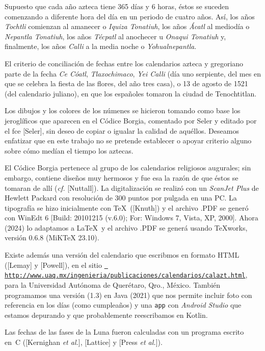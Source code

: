 Supuesto que cada a\~no azteca tiene 365 d\'ias y 6 horas, \'estos se suceden
comenzando a diferente hora del d\'ia en un periodo de cuatro a\~nos. As\'i,
los a\~nos {\it Tochtli\/} comienzan al amanecer o {\it Iquiza Tonatiuh}, los
a\~nos {\it \'Acatl\/} al mediod\'ia o {\it Nepantla Tonatiuh}, los a\~nos
{\it T\'ecpatl\/} al anochecer u {\it Onaqui Tonatiuh} y, finalmente, los
a\~nos {\it Calli\/} a la media noche o {\it Yohualnepantla}.

El criterio de conciliaci\'on de fechas entre los calendarios azteca y
gregoriano parte de la fecha {\it Ce C\'oatl}, {\it Tlaxochimaco}, {\it Yei
Calli\/} (d\'ia uno serpiente, del mes en que se celebra la fiesta de las
flores, del a\~no tres casa), o 13 de agosto de 1521 (del calendario juliano),
en que los espa\~noles tomaron la ciudad de Tenochtitlan.

Los dibujos y los colores de los n\'umenes se hicieron tomando como base los
jerogl\'ificos que aparecen en el C\'odice Borgia, comentado por Seler y
editado por el {\vv fce} [Seler], sin deseo de copiar o igualar la calidad de
aqu\'ellos. Deseamos enfatizar que en este trabajo no se pretende establecer o
apoyar criterio alguno sobre c\'omo med\'ian el tiempo los aztecas.

El C\'odice Borgia pertenece al grupo de los calendarios religiosos augurales;
sin embargo, contiene dise\~nos muy hermosos y fue esa la raz\'on de que
\'estos se tomaran de all\'i ({\it cf.} [Nuttall]). La digitalizaci\'on se
realiz\'o con un {\it ScanJet Plus\/} de Hewlett Packard con resoluci\'on de
300 puntos por pulgada en una PC. La tipograf\'ia se hizo inicialmente con \TeX\
([Knuth]) y el archivo .PDF se generó con WinEdt 6 [Build: 20101215 (v.6.0);
For: Windows 7, Vista, XP, 2000]. Ahora (2024) lo adaptamos a \LaTeX\ y el
archivo .PDF se generá usando TeXworks, versión 0.6.8 (MiKTeX 23.10).

Existe además una versi\'on del calendario que escribmos en formato HTML
([Lemay] y [Powell]), en el sitio
\href{http://www.uaq.mx/ingenieria/publicaciones/calendarios/calazt.html}{\tt
http://www.uaq.mx/ingenieria/publicaciones/calendarios/calazt.html}, para la
Universidad Aut\'onoma de Quer\'etaro, Qro., M\'exico. También programamos una
versión (1.3) en Java (2021) que nos permite incluir foto con referencia en
los días (como cumpleaños) y una {\tt app} con {\it Android Studio\/} que
estamos depurando y que probablemente reescribamos en Kotlin.

Las fechas de las fases de la Luna fueron calculadas con un programa escrito
en~C ([Kernighan {\it et al.}], [Lattice] y [Press {\it et al.}]).


